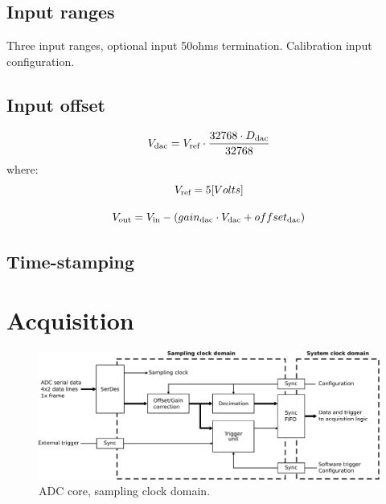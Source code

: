 \documentclass[11pt,a4paper]{article}
\newcommand{\subscript}[1]{\ensuremath{_{\textnormal{\scriptsize{#1}}}}}
\begin{document}
\subsection{Input ranges}
Three input ranges, optional input 50ohms termination.
Calibration input configuration.


\subsection{Input offset}

\begin{equation}\label{dac_digital2volts}
V\subscript{dac} = V\subscript{ref} \cdot \frac{32768 \cdot D\subscript{dac}}{32768} \\
\end{equation}
where:
\begin{equation}
V\subscript{ref} = 5 [Volts]
\end{equation}


\begin{equation}\label{in_dac_offset}
V\subscript{out} = V\subscript{in} - (gain\subscript{dac} \cdot V\subscript{dac} + offset\subscript{dac})
\end{equation}


\subsection{Time-stamping}


\section{Acquisition}

\begin{figure}[h!]
  \includegraphics[width=\textwidth]{figures/adc_core_fs_clk.pdf}
  \caption{ADC core, sampling clock domain.}
  \label{fig:adc_core_fs_clk}
\end{figure}
\end{document}
